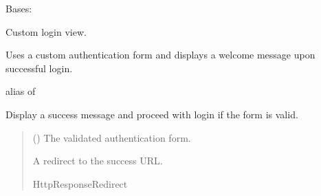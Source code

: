 \documentclass[letterpaper,10pt,english]{sphinxmanual}
\begin{document}
\begin{fulllineitems}
\label{\detokenize{users:users.views.CustomLoginView}}
\pysigstartsignatures
\pysiglinewithargsret
{}
{}
{}
\pysigstopsignatures
\sphinxAtStartPar
Bases: 

\sphinxAtStartPar
Custom login view.

\sphinxAtStartPar
Uses a custom authentication form and displays a welcome message upon successful login.

\begin{fulllineitems}
\label{\detokenize{users:users.views.CustomLoginView.authentication_form}}
\pysigstartsignatures
\pysigline
{}
\pysigstopsignatures
\sphinxAtStartPar
alias of {\hyperref[\detokenize{users:users.forms.CustomAuthenticationForm}]{}}

\end{fulllineitems}


\begin{fulllineitems}
\label{\detokenize{users:users.views.CustomLoginView.form_valid}}
\pysigstartsignatures
\pysiglinewithargsret
{}
{}
{}
\pysigstopsignatures
\sphinxAtStartPar
Display a success message and proceed with login if the form is valid.
\begin{quote}\begin{description}
\sphinxAtStartPar
{} () \textendash{} The validated authentication form.

\sphinxAtStartPar
A redirect to the success URL.

\sphinxAtStartPar
HttpResponseRedirect

\end{description}\end{quote}


\end{fulllineitems}
\end{fulllineitems}
\end{document}
